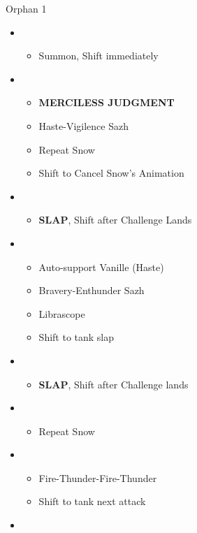 \begin{battle}{Orphan 1}
\begin{multicols}{2}
\begin{itemize}
    \item \second
    \begin{itemize}
        \item Summon, Shift immediately
    \end{itemize}
    \item \fourth
    \begin{itemize}
        \item \textbf{MERCILESS JUDGMENT}
        \item Haste-Vigilence Sazh
        \item Repeat Snow
        \item Shift to Cancel Snow's Animation
    \end{itemize}
    \item \third
    \begin{itemize}
    	\item \textbf{SLAP}, Shift after Challenge Lands
    \end{itemize}
    \item \fourth
    \begin{itemize}
        \item Auto-support Vanille (Haste)
        \item Bravery-Enthunder Sazh
        \item Librascope
        \item Shift to tank slap
    \end{itemize}
    \item \third
    \begin{itemize}
        \item \textbf{SLAP}, Shift after Challenge lands
    \end{itemize}
    \item \fourth
    \begin{itemize}
        \item Repeat Snow
    \end{itemize}
    \item \fifth
    \begin{itemize}
        \item Fire-Thunder-Fire-Thunder
        \item Shift to tank next attack
    \end{itemize}
    \item \third
    \begin{itemize}

\end{itemize}
\end{itemize}
\end{multicols}
\end{battle}
